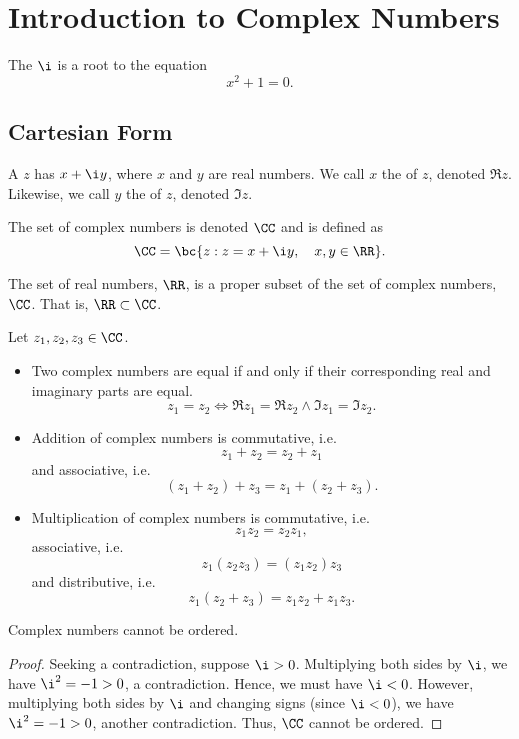 \chapter{Introduction to Complex Numbers}

\begin{definition}
    The  $\i$ is a root to the equation \[x^2 + 1 = 0.\]
\end{definition}

\section{Cartesian Form}

\begin{definition}
    A  $z$ has  $x + \i y$, where $x$ and $y$ are real numbers. We call $x$ the  of $z$, denoted $\Re z$. Likewise, we call $y$ the  of $z$, denoted $\Im z$.
\end{definition}

\begin{definition}
    The set of complex numbers is denoted $\CC$ and is defined as \[\CC = \bc{z : z = x + \i y , \quad x, y \in \RR}.\]
\end{definition}
\begin{remark}
    The set of real numbers, $\RR$, is a proper subset of the set of complex numbers, $\CC$. That is, $\RR \subset \CC$.
\end{remark}

\begin{fact}
    Let $z_1, z_2, z_3 \in \CC$.
    \begin{itemize}
        \item Two complex numbers are equal if and only if their corresponding real and imaginary parts are equal. \[z_1 = z_2 \iff \Re z_1 = \Re z_2 \land \Im z_1 = \Im z_2.\]
        \item Addition of complex numbers is commutative, i.e. \[z_1 + z_2 = z_2 + z_1\] and associative, i.e. \[(z_1 + z_2) + z_3 = z_1 + (z_2 + z_3).\]
        \item Multiplication of complex numbers is commutative, i.e. \[z_1z_2 = z_2z_1,\] associative, i.e. \[z_1(z_2z_3) = (z_1z_2)z_3\] and distributive, i.e. \[z_1(z_2 + z_3) = z_1z_2 + z_1z_3.\]
    \end{itemize}
\end{fact}

\begin{proposition}
    Complex numbers cannot be ordered.
\end{proposition}
\begin{proof}
    Seeking a contradiction, suppose $\i > 0$. Multiplying both sides by $\i$, we have $\i^2 = -1 > 0$, a contradiction. Hence, we must have $\i < 0$. However, multiplying both sides by $\i$ and changing signs (since $\i < 0$), we have $\i^2 = -1 > 0$, another contradiction. Thus, $\CC$ cannot be ordered.
\end{proof}

